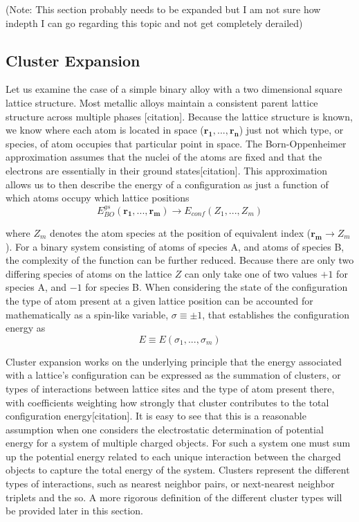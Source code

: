 \documentclass{article}
\begin{document}
(Note: This section probably needs to be expanded but I am not sure how indepth I can go regarding this topic and not get completely derailed)

\subsection{Cluster Expansion}

Let us examine the case of a simple binary alloy with a two dimensional square lattice structure. Most metallic alloys maintain a consistent parent lattice structure across multiple phases [citation]. Because the lattice structure is known, we know where each atom is located in space ($\bm{r_1}, . . .,\bm{r_n}$) just not which type, or species, of atom occupies that particular point in space. The Born-Oppenheimer approximation assumes that the nuclei of the atoms are fixed and that the electrons are essentially in their ground states[citation]. This approximation allows us to then describe the energy of a configuration as just a function of which atoms occupy which lattice positions
$$E_{BO}^{gs}(\bm{r_1}, . . .,\bm{r_m})\rightarrow E_{conf}(Z_1,...,Z_{m})$$

\noindent where $Z_m$ denotes the atom species at the position of equivalent index ($\bm{r_m} \rightarrow Z_m$). For a binary system consisting of atoms of species A, and atoms of species B, the complexity of the function can be further reduced. Because there are only two differing species of atoms on the lattice $Z$ can only take one of two values $+1$ for species A, and $-1$ for species B. When considering the state of the configuration the type of atom present at a given lattice position can be accounted for mathematically as a spin-like variable, $\sigma \equiv \pm 1$, that establishes the configuration energy as
$$ E \equiv E(\sigma_1, ... ,\sigma_m) $$

Cluster expansion works on the underlying principle that the energy associated with a lattice's configuration can be expressed as the summation of clusters, or types of interactions between lattice sites and the type of atom present there, with coefficients weighting how strongly that cluster contributes to the total configuration energy[citation]. It is easy to see that this is a reasonable assumption when one considers the electrostatic determination of potential energy for a system of multiple charged objects. For such a system one must sum up the potential energy related to each unique interaction between the charged objects to capture the total energy of the system. Clusters represent the different types of interactions, such as nearest neighbor pairs, or next-nearest neighbor triplets and the so. A more rigorous definition of the different cluster types will be provided later in this section. 
\end{document}
